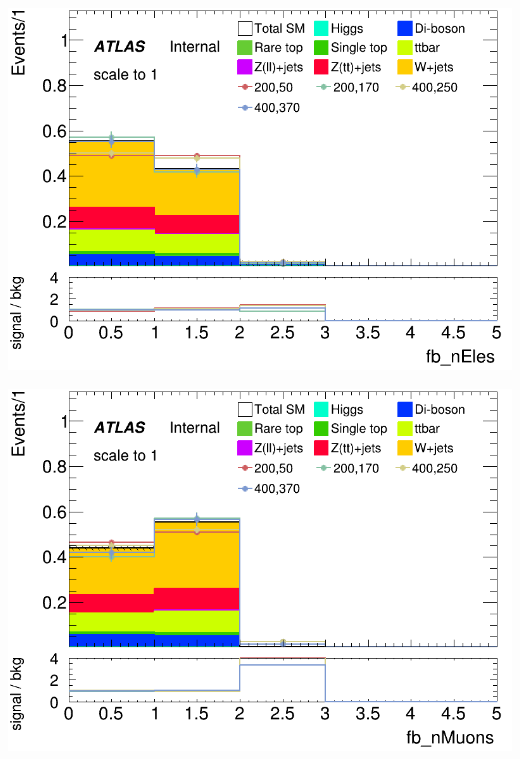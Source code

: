 \documentclass[usenames,dvipsnames]{beamer}
\begin{document}
\begin{frame}
\begin{minipage}{0.2\textwidth}
    \end{minipage}
     
    \vspace{0.5cm} %

    \begin{minipage}{0.2\textwidth}
        \centering
        \includegraphics[width=\textwidth]{graphics/LH_met_sig/LH_fb_nEles_norm.png}
    \end{minipage}
    \hfill
    \begin{minipage}{0.2\textwidth}
        \centering
        \includegraphics[width=\textwidth]{graphics/LH_met_sig/LH_fb_nMuons_norm.png}
    \end{minipage}
    \hfill
    \begin{minipage}{0.2\textwidth}

\end{minipage}
\end{frame}
\end{document}
